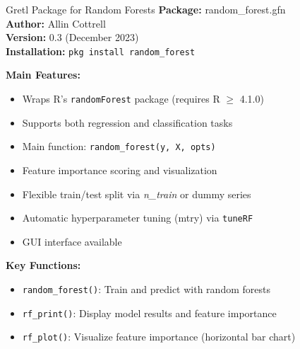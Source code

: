 \documentclass[11pt]{beamer}
\begin{document}
\begin{frame}{Gretl Package for Random Forests}
  \textbf{Package:} random\_forest.gfn \\
  \textbf{Author:} Allin Cottrell \\
  \textbf{Version:} 0.3 (December 2023) \\
  \textbf{Installation:} \texttt{pkg install random\_forest}

  \vspace{0.1cm}

  \textbf{Main Features:}
  \begin{itemize}
    \item Wraps R's \texttt{randomForest} package (requires R $\geq$ 4.1.0)
    \item Supports both regression and classification tasks
    \item Main function: \texttt{random\_forest(y, X, opts)}
    \item Feature importance scoring and visualization
    \item Flexible train/test split via \textit{n\_train} or dummy series
    \item Automatic hyperparameter tuning (mtry) via \texttt{tuneRF}
    \item GUI interface available%
  \end{itemize}

  \vspace{0.1cm}

  \textbf{Key Functions:}
  \begin{itemize}
    \item \texttt{random\_forest()}: Train and predict with random forests
    \item \texttt{rf\_print()}: Display model results and feature importance
    \item \texttt{rf\_plot()}: Visualize feature importance (horizontal bar chart)
  \end{itemize}
\end{frame}
\end{document}
